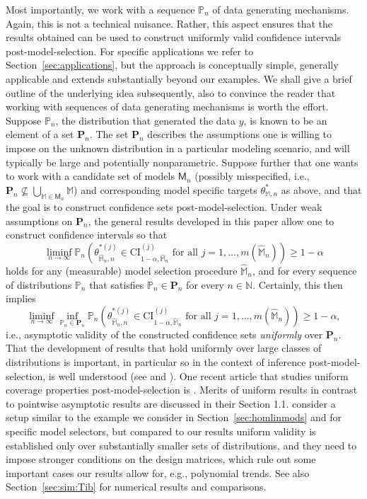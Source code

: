 \documentclass[preprint]{imsart}
\renewcommand{\P}{{\mathbb P}}
\newcommand{\N}{{\mathbb N}}
\newcommand{\M}{\mathbb M}
\numberwithin{equation}{section}
\begin{document}
Most importantly, we work with a sequence $\P_n$ of data generating mechanisms. Again, this is not a technical nuisance. Rather, this aspect ensures that the results obtained can be used to construct uniformly valid confidence intervals post-model-selection. For specific applications we refer to Section~\ref{sec:applications}, but the approach is conceptually simple, generally applicable and extends substantially beyond our examples. We shall give a brief outline of the underlying idea subsequently, also to convince the reader that working with sequences of data generating mechanisms is worth the effort. Suppose $\mathbb{P}_n$, the distribution that generated the data $y$, is known to be an element of a set $\mathbf{P}_n$. The set $\mathbf{P}_n$ describes the assumptions one is willing to impose on the unknown distribution in a particular modeling scenario, and will typically be large and potentially nonparametric. Suppose further that one wants to work with a candidate set of models $\mathsf{M}_n$ (possibly misspecified, i.e., $\mathbf{P}_n \not \subseteq \bigcup_{\M\in\mathsf{M}_n}\M$) and corresponding model specific targets $\theta_{\mathbb{M}, n}^*$ as above, and that the goal is to construct confidence sets post-model-selection. Under weak assumptions on $\mathbf{P}_n$, the general results developed in this paper allow one to construct confidence intervals so that 
%
\begin{equation*}
\liminf_{n \to \infty} \mathbb{P}_n\left( \theta^{*(j)}_{\hat{\mathbb{M}}_n, n} \in \mathrm{CI}^{(j)}_{1-\alpha, \hat{\mathbb{M}}_n} \text{ for all } j = 1, \hdots, m(\hat{\mathbb{M}}_n) \right) \geq 1-\alpha
\end{equation*}
%
holds for any (measurable) model selection procedure $\hat{\mathbb{M}}_n$, and for every sequence of distributions $\mathbb{P}_n$ that satisfies $\mathbb{P}_n \in \mathbf{P}_n$ for every $n \in \N$. Certainly, this then implies
%
\begin{equation*}
\liminf_{n \to \infty} \inf_{\mathbb{P}_n \in \mathbf{P}_n}  \mathbb{P}_n\left( \theta^{*(j)}_{\hat{\mathbb{M}}_n, n} \in \mathrm{CI}^{(j)}_{1-\alpha, \hat{\mathbb{M}}_n} \text{ for all } j = 1, \hdots, m(\hat{\mathbb{M}}_n) \right) \geq 1-\alpha,
\end{equation*}
%
i.e., asymptotic validity of the constructed confidence sets \textit{uniformly} over $\mathbf{P}_n$. That the development of results that hold uniformly over large classes of distributions is important, in particular so in the context of inference post-model-selection, is well understood (see \cite{leeb03finite} and \cite{leeb05model}). One recent article that studies uniform coverage properties post-model-selection is \cite{Tib15a}. Merits of uniform results in contrast to pointwise asymptotic results are discussed in their Section 1.1. \cite{Tib15a} consider a setup similar to the example we consider in Section~\ref{sec:homlinmods} and for specific model selectors, but compared to our results uniform validity is established only over substantially smaller sets of distributions, and they need to impose stronger conditions on the design matrices, which rule out some important cases our results allow for, e.g., polynomial trends. See also Section~\ref{sec:sim:Tib} for numerical results and comparisons. 
\end{document}
